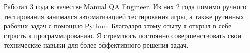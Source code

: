 \documentclass[a4paper, 12pt]{article}
\begin{document}
Работал 3 года в качестве Manual QA Engineer.
Из них 2 года помимо ручного тестирования занимался автоматизацией тестирования игры,
а также рутинных рабочих задач с помощью Python. Благодаря этому опыту я открыл в себе страсть к программированию.
Я стремлюсь постоянно совершенствовать свои технические навыки для более эффективного решения задач.
\end{document}
